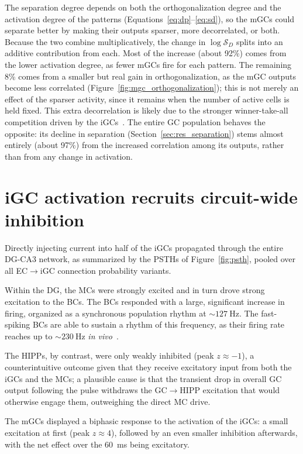 The separation degree depends on both the orthogonalization degree and the activation degree of the patterns
(Equations~\ref{eq:dp}--\ref{eq:sd}), so the mGCs could separate better by making their outputs sparser, more decorrelated, or
both. Because the two combine multiplicatively, the change in $\log \mathcal{S}_D$ splits into an additive contribution from each.
Most of the increase (about 92\%) comes from the lower activation degree, as fewer mGCs fire for each pattern. The remaining 8\%
comes from a smaller but real gain in orthogonalization, as the mGC outputs become less correlated
(Figure~\ref{fig:mgc_orthogonalization}); this is not merely an effect
of the sparser activity, since it remains when the number of active cells is held fixed. This extra
decorrelation is likely due to the stronger winner-take-all competition driven by the iGCs~\parencite{coultripCortical1992}. The
entire GC population behaves the opposite: its decline in separation (Section~\ref{sec:res_separation}) stems almost entirely
(about 97\%) from the increased correlation among its outputs, rather than from any change in activation.

\section{iGC activation recruits circuit-wide inhibition}\label{sec:res_activation}

Directly injecting current into half of the iGCs propagated through the entire DG-CA3 network, as summarized by the PSTHs of
Figure~\ref{fig:psth}, pooled over all EC$\to$iGC connection probability variants.

Within the DG, the MCs were strongly excited and in turn drove strong excitation to the BCs. The BCs responded with a large,
significant increase in firing, organized as a synchronous population rhythm at $\sim\SI{127}{\hertz}$. The fast-spiking BCs are
able to sustain a rhythm of this frequency, as their firing rate reaches up to $\sim\SI{230}{\hertz}$ \textit{in
vivo}~\parencite{lubkeSpecialized1998}.

The HIPPs, by contrast, were only weakly inhibited (peak $z \approx -1$), a counterintuitive outcome given that they receive
excitatory input from both the iGCs and the MCs; a plausible cause is that the transient drop in overall GC output following the
pulse withdraws the GC$\to$HIPP excitation that would otherwise engage them, outweighing the direct MC drive.

The mGCs displayed a biphasic response to the activation of the iGCs: a small excitation at first (peak $z \approx 4$), followed
by an even smaller inhibition afterwards, with the net effect over the \SI{60}{\milli\second} being excitatory.

